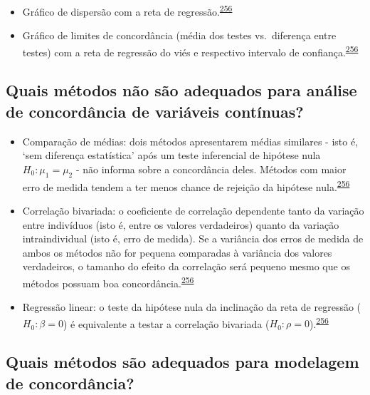 \documentclass[
  a4paper,
]{book}
\begin{document}
\begin{itemize}
\item
  Gráfico de dispersão com a reta de regressão.\textsuperscript{\protect\hyperlink{ref-altman1983}{256}}
\item
  Gráfico de limites de concordância (média dos testes vs.~diferença entre testes) com a reta de regressão do viés e respectivo intervalo de confiança.\textsuperscript{\protect\hyperlink{ref-altman1983}{256}}
\end{itemize}

\hypertarget{quais-muxe9todos-nuxe3o-suxe3o-adequados-para-anuxe1lise-de-concorduxe2ncia-de-variuxe1veis-contuxednuas}{%
\subsection{Quais métodos não são adequados para análise de concordância de variáveis contínuas?}\label{quais-muxe9todos-nuxe3o-suxe3o-adequados-para-anuxe1lise-de-concorduxe2ncia-de-variuxe1veis-contuxednuas}}

\begin{itemize}
\item
  Comparação de médias: dois métodos apresentarem médias similares - isto é, `sem diferença estatística' após um teste inferencial de hipótese nula \(H_{0}:\mu_{1} = \mu_{2}\) - não informa sobre a concordância deles. Métodos com maior erro de medida tendem a ter menos chance de rejeição da hipótese nula.\textsuperscript{\protect\hyperlink{ref-altman1983}{256}}
\item
  Correlação bivariada: o coeficiente de correlação dependente tanto da variação entre indivíduos (isto é, entre os valores verdadeiros) quanto da variação intraindividual (isto é, erro de medida). Se a variância dos erros de medida de ambos os métodos não for pequena comparadas à variância dos valores verdadeiros, o tamanho do efeito da correlação será pequeno mesmo que os métodos possuam boa concordância.\textsuperscript{\protect\hyperlink{ref-altman1983}{256}}
\item
  Regressão linear: o teste da hipótese nula da inclinação da reta de regressão (\(H_{0}:\beta = 0\)) é equivalente a testar a correlação bivariada (\(H_{0}:\rho = 0\)).\textsuperscript{\protect\hyperlink{ref-altman1983}{256}}
\end{itemize}

\hypertarget{quais-muxe9todos-suxe3o-adequados-para-modelagem-de-concorduxe2ncia}{%
\subsection{Quais métodos são adequados para modelagem de concordância?}\label{quais-muxe9todos-suxe3o-adequados-para-modelagem-de-concorduxe2ncia}}
\end{document}
